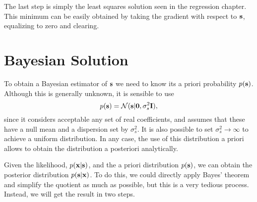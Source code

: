 The last step is simply the least squares solution seen in the regression chapter. This minimum can be easily obtained by taking the gradient with respect to ${\mathbf s}$, equalizing to zero and clearing.


\section{Bayesian Solution}

To obtain a Bayesian estimator of ${\mathbf s}$ we need to know its a priori probability $p({\mathbf s})$. Although this is generally unknown, it is sensible to use
\begin{equation}
p({\mathbf s}) = {\mathcal N}({\mathbf s} | \mathbf{0}, \sigma_s^2{\mathbf I}),
\end{equation}
since it considers acceptable any set of real coefficients, and assumes that these have a null mean and a dispersion set by $\sigma_s^2 $. It is also possible to set $\sigma_s^2 \rightarrow \infty$ to achieve a uniform distribution. In any case, the use of this distribution a priori allows to obtain the distribution a posteriori analytically.

Given the likelihood, $p({\mathbf x} | {\mathbf s})$, and the a priori distribution $p({\mathbf s})$, we can obtain the posterior distribution $p({\mathbf s} | {\mathbf x}) $. To do this, we could directly apply Bayes' theorem and simplify the quotient as much as possible, but this is a very tedious process. Instead, we will get the result in two steps.

